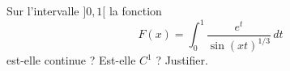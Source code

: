 \begin{exercice}\label{exo_I-3-5}

Sur l'intervalle $]0,1[$ la fonction
\begin{equation}
	F(x)=\int_0^1\frac{  e^{t} }{  \sin(xt)^{1/3} }\,dt
\end{equation}
est-elle continue ? Est-elle $C^1$ ? Justifier.

\end{exercice}



